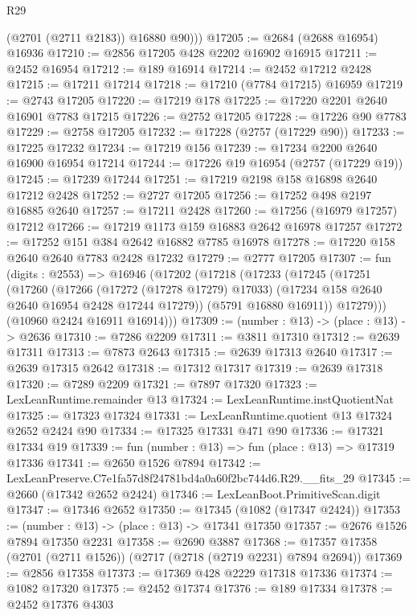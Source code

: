 \begin{lexlean}{R29}
\begin{coremodule}
          (@2701 (@2711 @2183))
          @16880
          @90)))
@17205 := @2684 (@2688 @16954) @16936
@17210 := @2856 @17205 @428 @2202 @16902 @16915
@17211 := @2452 @16954
@17212 := @189 @16914
@17214 := @2452 @17212 @2428
@17215 := @17211 @17214
@17218 := @17210 (@7784 @17215) @16959
@17219 := @2743 @17205
@17220 := @17219 @178
@17225 := @17220 @2201 @2640 @16901 @7783 @17215
@17226 := @2752 @17205
@17228 := @17226 @90 @7783
@17229 := @2758 @17205
@17232 := @17228 (@2757 (@17229 @90))
@17233 := @17225 @17232
@17234 := @17219 @156
@17239 := @17234 @2200 @2640 @16900 @16954 @17214
@17244 := @17226 @19 @16954 (@2757 (@17229 @19))
@17245 := @17239 @17244
@17251 := @17219 @2198 @158 @16898 @2640 @17212 @2428
@17252 := @2727 @17205
@17256 := @17252 @498 @2197 @16885 @2640
@17257 := @17211 @2428
@17260 := @17256 (@16979 @17257) @17212
@17266 := @17219 @1173 @159 @16883 @2642 @16978 @17257
@17272 := @17252 @151 @384 @2642 @16882 @7785 @16978
@17278 := @17220 @158 @2640 @2640 @7783 @2428 @17232
@17279 := @2777 @17205
@17307 := fun (digits : @2553) =>
  @16946
    (@17202
      (@17218
        (@17233
          (@17245
            (@17251
              (@17260
                (@17266
                  (@17272 (@17278 @17279) @17033)
                  (@17234 @158 @2640 @2640 @16954 @2428 @17244 @17279))
                (@5791 @16880 @16911))
              @17279)))
        (@10960 @2424 @16911 @16914)))
@17309 := (number : @13) -> (place : @13) -> @2636
@17310 := @7286 @2209
@17311 := @3811 @17310
@17312 := @2639 @17311
@17313 := @7873 @2643
@17315 := @2639 @17313 @2640
@17317 := @2639 @17315 @2642
@17318 := @17312 @17317
@17319 := @2639 @17318
@17320 := @7289 @2209
@17321 := @7897 @17320
@17323 := LexLeanRuntime.remainder @13
@17324 := LexLeanRuntime.instQuotientNat
@17325 := @17323 @17324
@17331 := LexLeanRuntime.quotient @13 @17324 @2652 @2424 @90
@17334 := @17325 @17331 @471 @90
@17336 := @17321 @17334 @19
@17339 := fun (number : @13) => fun (place : @13) => @17319 @17336
@17341 := @2650 @1526 @7894
@17342 := LexLeanPreserve.C7e1fa57d8f24781bd4a0a60f2bc744d6.R29.__fits_29
@17345 := @2660 (@17342 @2652 @2424)
@17346 := LexLeanBoot.PrimitiveScan.digit
@17347 := @17346 @2652
@17350 := @17345 (@1082 (@17347 @2424))
@17353 := (number : @13) -> (place : @13) -> @17341 @17350
@17357 := @2676 @1526 @7894 @17350 @2231
@17358 := @2690 @3887
@17368 := @17357 @17358 (@2701 (@2711 @1526)) (@2717 (@2718 (@2719 @2231) @7894 @2694))
@17369 := @2856 @17358
@17373 := @17369 @428 @2229 @17318 @17336
@17374 := @1082 @17320
@17375 := @2452 @17374
@17376 := @189 @17334
@17378 := @2452 @17376 @4303

\end{coremodule}
\end{lexlean}
